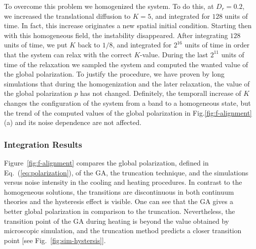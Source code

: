 \documentclass[reprint,floatfix,amsmath,amssymb,aps,pre,showkeys,showpacs,superscriptaddress]{revtex4-1}
\newcommand{\p}{p}
\newcommand{\hl}[1]{\textcolor{hlcolor}{#1}}
\newcommand{\req}[1]{Eq.~(\ref{#1})}
\begin{document}
\hl{
To overcome this problem we homogenized the system. To do this, at $D_r=0.2$, we increased the translational diffusion to $K=5$, and integrated for $128$ units of time. In fact, this increase originates a new spatial initial condition. Starting then with this homogeneous field, the instability
disappeared. After integrating $128$ units of time, we put $K$ back to $1/8$, and integrated for $2^{16}$ units of time in order that the system can relax with the correct $K$-value. During the last $2^{11}$ units of time of the relaxation we sampled the system and  computed the wanted value of the global polarization. To justify the procedure, we have proven by long simulations that during the homogenization and the later relaxation, the value of the global polarization $\p$ has not changed. Definitely, the temporall increase of $K$ changes the configuration of the system from a band to a homogeneous state, but the trend of  the computed values of the global polarization in Fig.\ref{fig:f-alignment}(a) and its noise dependence are not affected.
}

\subsubsection{Integration Results}

Figure~\ref{fig:f-alignment} compares the global polarization, defined in \req{eq:polarization}, of the GA, the truncation technique, and the simulations versus noise intensity in the cooling and heating procedures. In contrast to the homogeneous solutions, the transitions are discontinuous in both continuum theories and the hysteresis effect is visible. One can see that the GA gives a better global polarization in comparison to the truncation. Nevertheless, the transition point of the GA during heating is beyond the value obtained by microscopic simulation, and the truncation method predicts a closer transition point [see Fig.~\ref{fig:sim-hystersis}].
\end{document}
